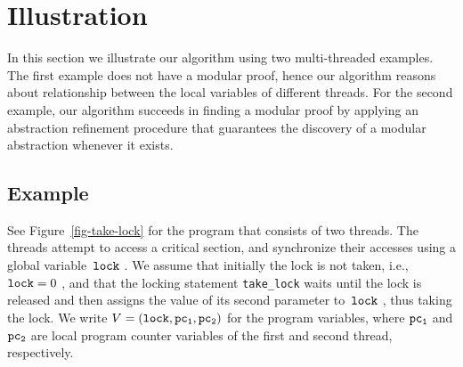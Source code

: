 \section{Illustration}\label{sec-illustration}

In this section we illustrate our algorithm using two multi-threaded
examples.
The first example does not have a modular proof, hence our algorithm
reasons about relationship between the local variables of different
threads.
For the second example, our algorithm succeeds in finding a modular
proof by applying an abstraction refinement procedure that guarantees
the discovery of a modular abstraction whenever it exists.

\iffalse

Firstly, the algorithm generates thread reachability assertions
in the form of trees of reachable states for each thread.
If a reachable state is found to violate the mutual exclusion
property, then our algorithm generates a set of Horn clauses that
encodes how the abstract error state was reached.
If the set of Horn clauses is satisfiable, our solving procedure
returns a solution which is used for abstraction refinement.

The first multi-threaded program does not have a thread-modular proof
and hence its verification leads to environment transitions that
reveal some facts about the local state of the threads. 
The second program can be proven correct using a thread-modular proof,
however, non-modular proofs that (unnecessarily) involve local
variables can also be used to prove correctness of this program. 
\fi

\subsection{Example \TakeLockBit}\label{subsec-takebit}

See Figure~\ref{fig-take-lock} for the program \TakeLockBit that
consists of two threads.
The threads attempt to access a critical section, and synchronize their
accesses using a global variable~$\mathtt{lock}\ $.
We assume that initially the lock is not taken, i.e., $\mathtt{lock} = 0\ $,
and that the locking statement \verb|take_lock| waits until the lock
is released and then assigns the value of its second parameter
to~$\mathtt{lock}\ $, thus taking the lock.
We write $V = (\mathtt{lock}, \mathtt{pc_1}, \mathtt{pc_2})$ for the program variables,
where $\mathtt{pc_1}$ and $\mathtt{pc_2}$ are local program counter variables of the
first and second thread, respectively.



